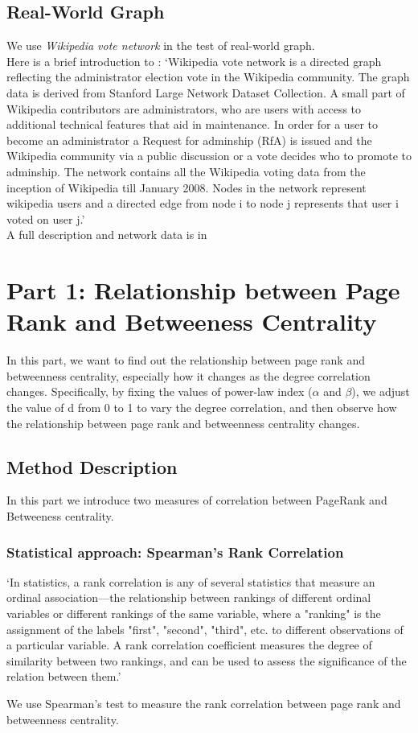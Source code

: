 \documentclass{article}
\begin{document}
\subsection{Real-World Graph}
We use \emph{Wikipedia vote network} in the test of real-world graph. \\
\hypertarget{wikivote_intro}{Here is a brief introduction to :}
`Wikipedia vote network is a directed graph reflecting the administrator election vote in the Wikipedia community. The graph data is derived from Stanford Large Network Dataset Collection. A small part of Wikipedia contributors are administrators, who are users with access to additional technical features that aid in maintenance. In order for a user to become an administrator a Request for adminship (RfA) is issued and the Wikipedia community via a public discussion or a vote decides who to promote to adminship. The network contains all the Wikipedia voting data from the inception of Wikipedia till January 2008. Nodes in the network represent wikipedia users and a directed edge from node i to node j represents that user i voted on user j.'\\
A full description and network data is in \cite{wikivote_source}


\section{Part 1: Relationship between Page Rank and Betweeness Centrality}
\par In this part, we want to find out the relationship between page rank and betweenness centrality, especially how it changes as the degree correlation changes. Specifically, by fixing the values of power-law index ($\alpha$ and $\beta$), we adjust the value of d from 0 to 1 to vary the degree correlation, and then observe how the relationship between page rank and betweenness centrality changes.
\subsection{Method Description}
In this part we introduce two measures of correlation between PageRank and Betweeness centrality.
\subsubsection{Statistical approach: Spearman's Rank Correlation }
\quad
\par `In statistics, a rank correlation is any of several statistics that measure an ordinal association—the relationship between rankings of different ordinal variables or different rankings of the same variable, where a "ranking" is the assignment of the labels "first", "second", "third", etc. to different observations of a particular variable. A rank correlation coefficient measures the degree of similarity between two rankings, and can be used to assess the significance of the relation between them.' \cite{spearman} 
\par We use Spearman's test to measure the rank correlation between page rank and betweenness centrality.
\end{document}

